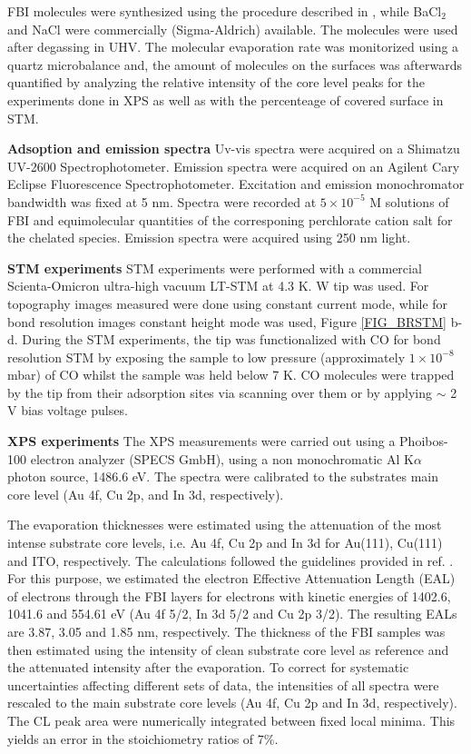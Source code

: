 \documentclass[aps,prl,reprint,longbibliography,superscriptaddress, english]{revtex4-1}
\def\BappCl{BaCl$_2$}
\begin{document}
FBI molecules were synthesized using the procedure described in \cite{rivilla_fluorescent_2020}, while \BappCl and NaCl were commercially (Sigma-Aldrich) available. The molecules were used after degassing in UHV.
The molecular evaporation rate was monitorized using a quartz microbalance and, the amount of molecules on the surfaces was afterwards quantified by analyzing the relative intensity of the core level peaks for the experiments done in XPS as well as with the percenteage of covered surface in STM. 

\textbf{Adsoption and emission spectra}
 Uv-vis spectra were acquired on a Shimatzu UV-2600 Spectrophotometer. Emission spectra were acquired on an Agilent Cary Eclipse Fluorescence Spectrophotometer. Excitation and emission monochromator bandwidth was fixed at 5 nm. Spectra were recorded at $5\times10^{-5}$ M solutions of FBI and equimolecular quantities of the corresponing perchlorate cation salt for the chelated species. Emission spectra were acquired using 250 nm light.

\textbf{STM experiments}
STM experiments were performed with a commercial Scienta-Omicron ultra-high vacuum LT-STM at 4.3 K. W tip  was used. For topography images measured were done using constant current mode, while for bond resolution images constant height mode was used, Figure \ref{FIG_BRSTM} b-d. During the STM experiments, the tip was functionalized with CO for bond resolution STM by exposing the sample to low pressure (approximately $1 \times 10^{-8}$ mbar) of CO whilst the sample was held below 7 K. CO molecules were trapped by the tip from their adsorption sites via scanning over them or by applying $\sim$ 2 V bias voltage pulses. 

\textbf{XPS experiments}
The XPS measurements were carried out using a Phoibos-100 electron analyzer (SPECS GmbH), using a non monochromatic Al K$\alpha$ photon source, 1486.6 eV. The spectra were calibrated to the substrates main core level (Au 4f, Cu 2p, and In 3d, respectively). 

The evaporation thicknesses were estimated using the attenuation of the most intense substrate core levels, i.e. Au 4f, Cu 2p and In 3d for Au(111), Cu(111) and ITO, respectively. The calculations followed the guidelines provided in ref. \cite{powell_practical_2020}. For this purpose, we estimated the electron Effective Attenuation Length (EAL) of electrons through the FBI layers for electrons with kinetic energies of 1402.6, 1041.6 and 554.61 eV (Au 4f 5/2, In 3d 5/2 and Cu 2p 3/2). The resulting EALs are 3.87, 3.05 and 1.85 nm, respectively. The thickness of the FBI samples was then estimated using the intensity of clean substrate core level as reference and the attenuated intensity after the evaporation. To correct for systematic uncertainties affecting different sets of data, the intensities of all spectra were rescaled to the main substrate core levels (Au 4f, Cu 2p and In 3d, respectively). The CL peak area were numerically integrated between fixed local minima. This yields an error in the stoichiometry ratios of 7\%. 
\end{document}
